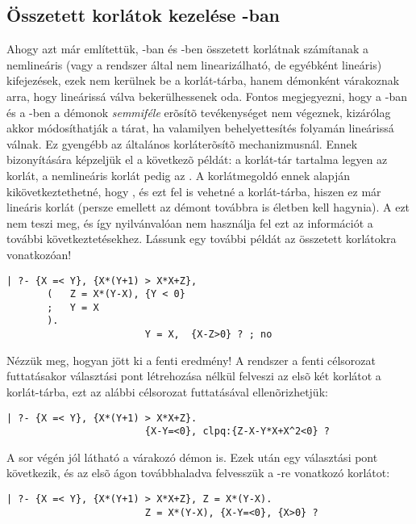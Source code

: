 \subsection{Összetett korlátok kezelése \Clpq-ban}

Ahogy azt már említettük, \Clpq-ban és \Clpr-ben összetett korlátnak
számítanak a nemlineáris (vagy a rendszer által nem linearizálható, de
egyébként lineáris) kifejezések, ezek nem kerülnek be a korlát-tárba, hanem
démonként várakoznak arra, hogy lineárissá válva bekerülhessenek oda.
Fontos megjegyezni, hogy a \Clpq-ban és a \Clpr-ben a démonok
\emph{semmiféle} erõsítõ tevékenységet nem végeznek, kizárólag akkor
módosíthatják a tárat, ha valamilyen behelyettesítés folyamán lineárissá
válnak. Ez gyengébb az általános korláterõsítõ mechanizmusnál. Ennek
bizonyítására képzeljük el a következõ példát: a korlát-tár tartalma legyen
az  korlát, a nemlineáris korlát pedig az . A
korlátmegoldó ennek alapján kikövetkeztethetné, hogy , és ezt
fel is vehetné a korlát-tárba, hiszen ez már lineáris korlát (persze emellett
az  démont továbbra is életben kell hagynia). A  ezt
nem teszi meg, és így nyilvánvalóan nem használja fel ezt az információt
a további következtetésekhez.
\br
Lássunk egy további példát az összetett korlátokra vonatkozóan!

\begin{verbatim}
| ?- {X =< Y}, {X*(Y+1) > X*X+Z}, 
       (   Z = X*(Y-X), {Y < 0}
       ;   Y = X
       ).
                        Y = X,  {X-Z>0} ? ; no
\end{verbatim}

Nézzük meg, hogyan jött ki a fenti eredmény! A rendszer a fenti célsorozat
futtatásakor választási pont létrehozása nélkül felveszi az elsõ két korlátot
a korlát-tárba, ezt az alábbi célsorozat futtatásával ellenõrizhetjük:

\begin{verbatim}
| ?- {X =< Y}, {X*(Y+1) > X*X+Z}.
                        {X-Y=<0}, clpq:{Z-X-Y*X+X^2<0} ?
\end{verbatim}

A sor végén jól látható a várakozó démon is. Ezek után egy választási pont
következik, és az elsõ ágon továbbhaladva felvesszük a -re vonatkozó
korlátot:

\begin{verbatim}
| ?- {X =< Y}, {X*(Y+1) > X*X+Z}, Z = X*(Y-X).
                        Z = X*(Y-X), {X-Y=<0}, {X>0} ? 
\end{verbatim}


